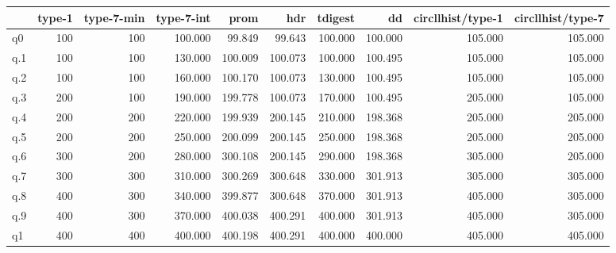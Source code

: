\begin{tabular}{lrrrrrrrrr}
\toprule
{} &  type-1 &  type-7-min &  type-7-int &    prom &     hdr &  tdigest &      dd &  circllhist/type-1 &  circllhist/type-7 \\
\midrule
q0  &     100 &         100 &     100.000 &  99.849 &  99.643 &  100.000 & 100.000 &            105.000 &            105.000 \\
q.1 &     100 &         100 &     130.000 & 100.009 & 100.073 &  100.000 & 100.495 &            105.000 &            105.000 \\
q.2 &     100 &         100 &     160.000 & 100.170 & 100.073 &  130.000 & 100.495 &            105.000 &            105.000 \\
q.3 &     200 &         100 &     190.000 & 199.778 & 100.073 &  170.000 & 100.495 &            205.000 &            105.000 \\
q.4 &     200 &         200 &     220.000 & 199.939 & 200.145 &  210.000 & 198.368 &            205.000 &            205.000 \\
q.5 &     200 &         200 &     250.000 & 200.099 & 200.145 &  250.000 & 198.368 &            205.000 &            205.000 \\
q.6 &     300 &         200 &     280.000 & 300.108 & 200.145 &  290.000 & 198.368 &            305.000 &            205.000 \\
q.7 &     300 &         300 &     310.000 & 300.269 & 300.648 &  330.000 & 301.913 &            305.000 &            305.000 \\
q.8 &     400 &         300 &     340.000 & 399.877 & 300.648 &  370.000 & 301.913 &            405.000 &            305.000 \\
q.9 &     400 &         300 &     370.000 & 400.038 & 400.291 &  400.000 & 301.913 &            405.000 &            305.000 \\
q1  &     400 &         400 &     400.000 & 400.198 & 400.291 &  400.000 & 400.000 &            405.000 &            405.000 \\
\bottomrule
\end{tabular}
